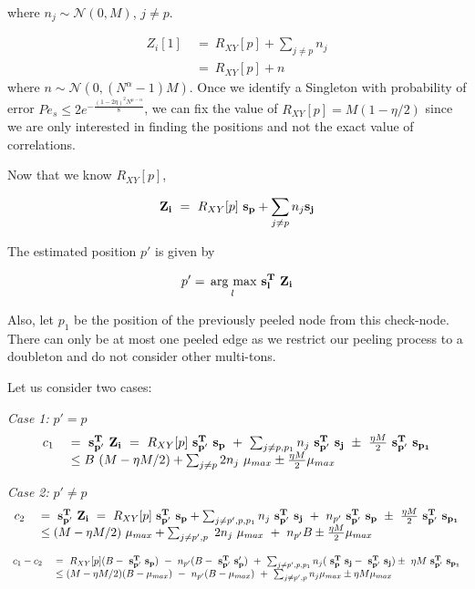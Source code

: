where $n_j \sim \mathcal{N}(0,M)$, $j \neq p$.

\[\begin{array}{ll}
Z_i[1] \ &= \ R_{XY}[p] + \sum_{j \neq p}n_j \\
&= \ R_{XY}[p] + n 
\end{array}
\]
where $n \sim \mathcal{N}(0,(N^\alpha-1)M)$. Once we identify a Singleton with probability of error $Pe_s \leq 2 e^{- \frac{(1-2\eta)^2N^{\mu-\alpha}}{8}}$, we can fix the value of $R_{XY}[p] = M(1-\eta/2)$ since we are only interested in finding the positions and not the exact value of correlations. 

Now that we know $R_{XY}[p]$, 

\[ \mathbf{Z_i} \ = \ R_{XY}[p] ~ \mathbf{s_p}+ \sum_{j \neq p}n_j \mathbf{s_j} \\
\]

The estimated position $p'$ is given by

\[ p' = \underset{l}{\operatorname*{\,arg\ max}}\ \bf s^T_l ~ Z_i\]

Also, let $p_1$ be the position of the previously peeled node from this check-node. There can only be at most one peeled edge as we restrict our peeling process to a doubleton and do not consider other multi-tons.
 
Let us consider two cases:

{\textit{Case 1:} $p' = p$}
\[
\begin{array}{ll}
c_1 \ &= \ \mathbf{s^T_{p'}} ~\mathbf{Z_i} \ = \ R_{XY}[p] {\bf ~s^T_{p'}~ s_p}\ + \ \sum_{j \neq p,p_1}n_j {\bf ~s^T_{p'}~ s_j} \ \pm \  \frac{\eta M}{2} {\bf ~s^T_{p'} ~ s_{p_1}} \\
&\leq B ~ (M-\eta M/2) +  \sum_{j \neq p} 2 n_j ~ \mu_{max} \pm \frac{\eta M}{2} \mu_{max}
\end{array} 
\]

{\textit{Case 2:} $p' \neq p$}
\[
\begin{array}{ll}
c_2 \ &= \ \mathbf{s^T_{p'}} ~\mathbf{Z_i}\ = \ R_{XY}[p]  {\bf ~s^T_{p'}~ s_p}+ \sum_{j \neq p',p,p_1}n_j{\bf ~s^T_{p'}~ s_j} \ + \ n_{p'} {\bf ~s^T_{p'}~ s_p} \ \pm \ \frac{\eta M}{2} {\bf ~s^T_{p'}~ s_{p_1}}\\
&\leq (M-\eta M/2) ~ \mu_{max} + \sum_{j \neq p',p} \ 2n_j ~ \mu_{max} \ + \ n_{p'} B \pm \frac{\eta M}{2} \mu_{max}
\end{array} 
\]

\[
\begin{array}{ll}
c_1 - c_2 \ &=  \ R_{XY}[p](B - {\bf ~s^T_{p'}~ s_p}) \ - \ n_{p'}(B - {\bf ~s^T_{p'}~ s_p'}) ~ + ~ \sum_{j \neq p',p,p_1}n_j ({\bf ~s^T_{p}~ s_j} - {\bf ~s^T_{p'}~ s_j})  \pm \  \eta M {\bf ~s^T_{p'} ~ s_{p_1}}  \\
&\leq (M-\eta M/2)(B-\mu_{max})  \ - \ n_{p'}(B - \mu_{max}) ~ + ~ \sum_{j \neq p',p}n_j \mu_{max} \pm \eta M \mu_{max}\\
\end{array} 
\]


